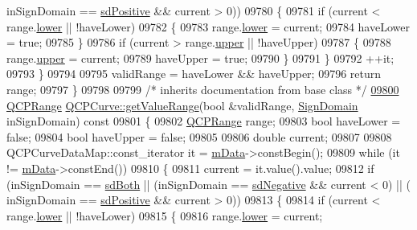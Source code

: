 \begin{DoxyCode}
      inSignDomain == \hyperlink{a00024_a661743478a1d3c09d28ec2711d7653d8a02951859f243a4d24e779cfbb5471030}{sdPositive} && current > 0))
09780     \{
09781       \textcolor{keywordflow}{if} (current < range.\hyperlink{a00049_aa3aca3edb14f7ca0c85d912647b91745}{lower} || !haveLower)
09782       \{
09783         range.\hyperlink{a00049_aa3aca3edb14f7ca0c85d912647b91745}{lower} = current;
09784         haveLower = \textcolor{keyword}{true};
09785       \}
09786       \textcolor{keywordflow}{if} (current > range.\hyperlink{a00049_ae44eb3aafe1d0e2ed34b499b6d2e074f}{upper} || !haveUpper)
09787       \{
09788         range.\hyperlink{a00049_ae44eb3aafe1d0e2ed34b499b6d2e074f}{upper} = current;
09789         haveUpper = \textcolor{keyword}{true};
09790       \}
09791     \}
09792     ++it;
09793   \}
09794   
09795   validRange = haveLower && haveUpper;
09796   \textcolor{keywordflow}{return} range;
09797 \}
09798 
09799 \textcolor{comment}{/* inherits documentation from base class */}
\hypertarget{a00115_source_l09800}{}\hyperlink{a00028_a5e788d369793e0179c5a46fce3bcb0fb}{09800} \hyperlink{a00049}{QCPRange} \hyperlink{a00028_a5e788d369793e0179c5a46fce3bcb0fb}{QCPCurve::getValueRange}(\textcolor{keywordtype}{bool} &validRange, 
      \hyperlink{a00024_a661743478a1d3c09d28ec2711d7653d8}{SignDomain} inSignDomain)\textcolor{keyword}{ const}
09801 \textcolor{keyword}{}\{
09802   \hyperlink{a00049}{QCPRange} range;
09803   \textcolor{keywordtype}{bool} haveLower = \textcolor{keyword}{false};
09804   \textcolor{keywordtype}{bool} haveUpper = \textcolor{keyword}{false};
09805   
09806   \textcolor{keywordtype}{double} current;
09807   
09808   QCPCurveDataMap::const\_iterator it = \hyperlink{a00028_a88d533e455bca96004b049e99168731b}{mData}->constBegin();
09809   \textcolor{keywordflow}{while} (it != \hyperlink{a00028_a88d533e455bca96004b049e99168731b}{mData}->constEnd())
09810   \{
09811     current = it.value().value;
09812     \textcolor{keywordflow}{if} (inSignDomain == \hyperlink{a00024_a661743478a1d3c09d28ec2711d7653d8a082b98cfb91a7363a3b5cd17b0c1cd60}{sdBoth} || (inSignDomain == \hyperlink{a00024_a661743478a1d3c09d28ec2711d7653d8a0fc9a70796ef60ad18ddd18056e6dc63}{sdNegative} && current < 0) || (
      inSignDomain == \hyperlink{a00024_a661743478a1d3c09d28ec2711d7653d8a02951859f243a4d24e779cfbb5471030}{sdPositive} && current > 0))
09813     \{
09814       \textcolor{keywordflow}{if} (current < range.\hyperlink{a00049_aa3aca3edb14f7ca0c85d912647b91745}{lower} || !haveLower)
09815       \{
09816         range.\hyperlink{a00049_aa3aca3edb14f7ca0c85d912647b91745}{lower} = current;

\end{DoxyCode}
